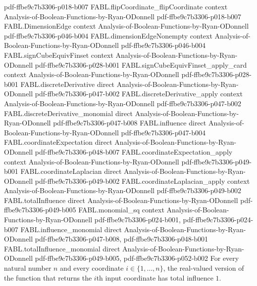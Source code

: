 \begin{theorem}
  {pdf-ffbe9c7b3306-p018-b007}
\proofstep
  {FABL.flipCoordinate_flipCoordinate}
  {context}
  {Analysis-of-Boolean-Functions-by-Ryan-ODonnell}
  {pdf-ffbe9c7b3306-p018-b007}
\proofstep
  {FABL.DimensionEdge}
  {context}
  {Analysis-of-Boolean-Functions-by-Ryan-ODonnell}
  {pdf-ffbe9c7b3306-p046-b004}
\proofstep
  {FABL.dimensionEdgeNonempty}
  {context}
  {Analysis-of-Boolean-Functions-by-Ryan-ODonnell}
  {pdf-ffbe9c7b3306-p046-b004}
\proofstep
  {FABL.signCubeEquivFinset}
  {context}
  {Analysis-of-Boolean-Functions-by-Ryan-ODonnell}
  {pdf-ffbe9c7b3306-p028-b001}
\proofstep
  {FABL.signCubeEquivFinset_apply_card}
  {context}
  {Analysis-of-Boolean-Functions-by-Ryan-ODonnell}
  {pdf-ffbe9c7b3306-p028-b001}
\proofstep
  {FABL.discreteDerivative}
  {direct}
  {Analysis-of-Boolean-Functions-by-Ryan-ODonnell}
  {pdf-ffbe9c7b3306-p047-b002}
\proofstep
  {FABL.discreteDerivative_apply}
  {context}
  {Analysis-of-Boolean-Functions-by-Ryan-ODonnell}
  {pdf-ffbe9c7b3306-p047-b002}
\proofstep
  {FABL.discreteDerivative_monomial}
  {direct}
  {Analysis-of-Boolean-Functions-by-Ryan-ODonnell}
  {pdf-ffbe9c7b3306-p047-b008}
\proofstep
  {FABL.influence}
  {direct}
  {Analysis-of-Boolean-Functions-by-Ryan-ODonnell}
  {pdf-ffbe9c7b3306-p047-b004}
\proofstep
  {FABL.coordinateExpectation}
  {direct}
  {Analysis-of-Boolean-Functions-by-Ryan-ODonnell}
  {pdf-ffbe9c7b3306-p048-b007}
\proofstep
  {FABL.coordinateExpectation_apply}
  {context}
  {Analysis-of-Boolean-Functions-by-Ryan-ODonnell}
  {pdf-ffbe9c7b3306-p049-b001}
\proofstep
  {FABL.coordinateLaplacian}
  {direct}
  {Analysis-of-Boolean-Functions-by-Ryan-ODonnell}
  {pdf-ffbe9c7b3306-p049-b002}
\proofstep
  {FABL.coordinateLaplacian_apply}
  {context}
  {Analysis-of-Boolean-Functions-by-Ryan-ODonnell}
  {pdf-ffbe9c7b3306-p049-b002}
\proofstep
  {FABL.totalInfluence}
  {direct}
  {Analysis-of-Boolean-Functions-by-Ryan-ODonnell}
  {pdf-ffbe9c7b3306-p049-b005}
\proofstep
  {FABL.monomial_sq}
  {context}
  {Analysis-of-Boolean-Functions-by-Ryan-ODonnell}
  {pdf-ffbe9c7b3306-p024-b001,
    pdf-ffbe9c7b3306-p024-b007}
\proofstep
  {FABL.influence_monomial}
  {direct}
  {Analysis-of-Boolean-Functions-by-Ryan-ODonnell}
  {pdf-ffbe9c7b3306-p047-b008,
    pdf-ffbe9c7b3306-p048-b001}
\proofstep
  {FABL.totalInfluence_monomial}
  {direct}
  {Analysis-of-Boolean-Functions-by-Ryan-ODonnell}
  {pdf-ffbe9c7b3306-p049-b005,
    pdf-ffbe9c7b3306-p052-b002}
For every natural number $n$ and every coordinate $i\in\{1,\ldots,n\}$, the
real-valued version of the function that returns the $i$th input coordinate has total
influence $1$.
\end{theorem}

